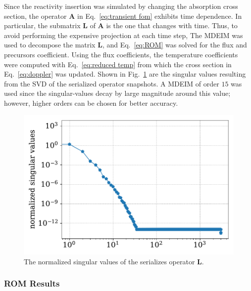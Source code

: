 \documentclass[review,number,sort&compress,12pt]{elsarticle}
\begin{document}
Since the reactivity insertion was simulated by changing the absorption cross section, the operator $\mathbf{A}$ in Eq.~\ref{eq:transient fom} exhibits time dependence.
In particular, the submatrix $\mathbf{L}$ of $\mathbf{A}$ is the one that changes with time.
Thus, to avoid performing the expensive projection at each time step, 
The MDEIM was used to decompose the matrix $\mathbf{L}$, and Eq.~\eqref{eq:ROM} was solved for the flux and precursors coefficient.
Using the flux coefficients, the temperature coefficients were computed with Eq.~\ref{eq:reduced temp} from which the cross section in Eq.~\ref{eq:doppler} was updated.
Shown in Fig.~\ref{fig:lra L singular values} are the singular values resulting from the SVD of the serialized operator snapshots.
A MDEIM of order $15$ was used since the singular-values decay by large magnitude around this value; however, higher orders can be chosen for better accuracy.

\begin{figure}[H]
	\includegraphics[width=1.0\linewidth]{../figures/LRA_L_singular_values.pdf}
	\caption{The normalized singular values of the serializes operator $\mathbf{L}$.}
	\label{fig:lra L singular values}
\end{figure}


\subsubsection{ROM Results}
\end{document}
